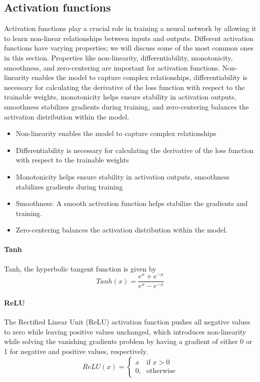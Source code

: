 \subsection{Activation functions}
Activation functions play a crucial role in training a neural network by allowing it to learn non-linear relationships between inputs and outputs.
Different activation functions have varying properties; we will discuss some of the most common ones in this section.
Properties like non-linearity, differentiability, monotonicity, smoothness, and zero-centering are important for activation functions.
Non-linearity enables the model to capture complex relationships, differentiability is necessary for calculating the derivative of the loss function with respect to the trainable weights, monotonicity helps ensure stability in activation outputs, smoothness stabilizes gradients during training, and zero-centering balances the activation distribution within the model.

\begin{itemize}
    \item Non-linearity enables the model to capture complex relationships
    \item Differentiability is necessary for calculating the derivative of the loss function with respect to the trainable weights
    \item Monotonicity helps ensure stability in activation outputs, smoothness stabilizes gradients during training
    \item Smoothness: A smooth activation function helps stabilize the gradients and training.
    \item Zero-centering balances the activation distribution within the model.
\end{itemize}

\paragraph{Tanh}
Tanh, the hyperbolic tangent function is given by
\begin{equation}\label{eq:tanh}
    Tanh(x) = \frac{e^x+e^{-x}}{e^x-e^{-x}}
\end{equation}

\paragraph{ReLU}
The Rectified Linear Unit (ReLU) activation function pushes all negative values to zero while leaving positive values unchanged,
which introduces non-linearity while solving the vanishing gradients problem by having a gradient of either 0 or 1 for negative and positive values, respectively.
\begin{equation}\label{eq:relu}
    ReLU(x) = \begin{cases} x & \mbox{if } x > 0 \\ \mbox{0,} & \mbox{otherwise} \end{cases}
\end{equation}

